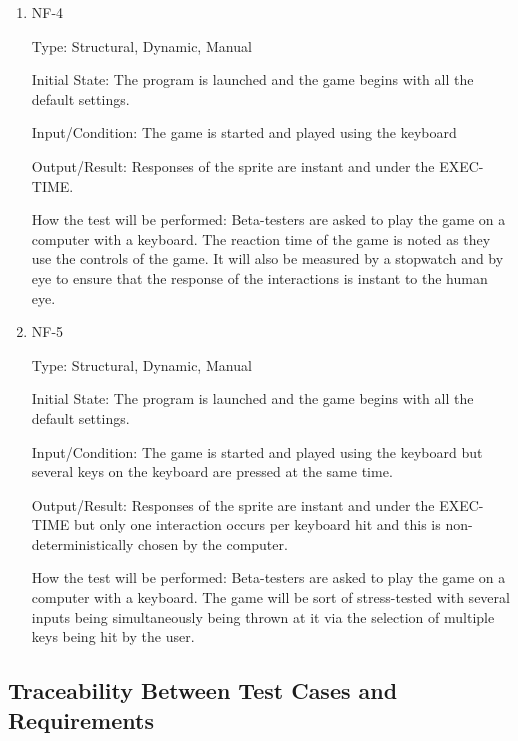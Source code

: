 \documentclass[12pt, titlepage]{article}
\begin{document}
\begin{enumerate}

\item{NF-4\\}

Type: Structural, Dynamic, Manual
                    
Initial State: The program is launched and the game begins with all the default settings.
                    
Input/Condition: The game is started and played using the keyboard
                    
Output/Result: Responses of the sprite are instant and under the EXEC-TIME.
                    
How the test will be performed: Beta-testers are asked to play the game on a computer with a keyboard. The reaction time of the game is noted as they use the controls of the game. It will also be measured by a stopwatch and by eye to ensure that the response of the interactions is instant to the human eye. 

\item{NF-5\\}

Type: Structural, Dynamic, Manual
                    
Initial State: The program is launched and the game begins with all the default settings.
                    
Input/Condition: The game is started and played using the keyboard but several keys on the keyboard are pressed at the same time. 
                    
Output/Result: Responses of the sprite are instant and under the EXEC-TIME but only one interaction occurs per keyboard hit and this is non-deterministically chosen by the computer.
                    
How the test will be performed: Beta-testers are asked to play the game on a computer with a keyboard. The game will be sort of stress-tested with several inputs being simultaneously being thrown at it via the selection of multiple keys being hit by the user.

\end{enumerate}

\newpage

\subsection{Traceability Between Test Cases and Requirements}
\end{document}
